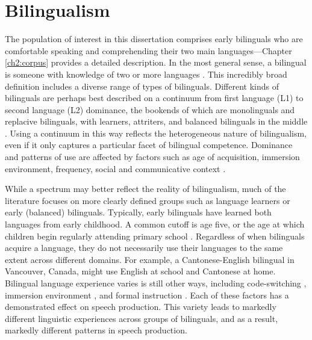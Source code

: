 \section{Bilingualism}\label{ch1:sec:bilingualism}

The population of interest in this dissertation comprises early bilinguals who are comfortable speaking and comprehending their two main languages---Chapter \ref{ch2:corpus} provides a detailed description. In the most general sense, a bilingual is someone with knowledge of two or more languages \citep{grosjean_1989_bilingual}. This incredibly broad definition includes a diverse range of types of bilinguals. Different kinds of bilinguals are perhaps best described on a continuum from first language (L1) to second language (L2) dominance, the bookends of which are monolinguals and replacive bilinguals, with learners, attriters, and balanced bilinguals in the middle \citep{gertken_2014_blp}. Using a continuum in this way reflects the heterogeneous nature of bilingualism, even if it only captures a particular facet of bilingual competence. Dominance and patterns of use are affected by factors such as age of acquisition, immersion environment, frequency, social and communicative context \citep{gertken_2014_blp}. 

While a spectrum may better reflect the reality of bilingualism, much of the literature focuses on more clearly defined groups such as language learners or early (balanced) bilinguals. Typically, early bilinguals have learned both languages from early childhood. A common cutoff is age five, or the age at which children begin regularly attending primary school \citep{amengual_2017_type}. Regardless of when bilinguals acquire a language, they do not necessarily use their languages to the same extent across different domains. For example, a Cantonese-English bilingual in Vancouver, Canada, might use English at school and Cantonese at home. Bilingual language experience varies is still other ways, including code-switching \citep{fricke_2016_dimensions}, immersion environment \citep{sancier_1997_drift}, and formal instruction \citep{fricke_2019_bilingualism}. Each of these factors has a demonstrated effect on speech production. This variety leads to markedly different linguistic experiences across groups of bilinguals, and as a result, markedly different patterns in speech production. 

